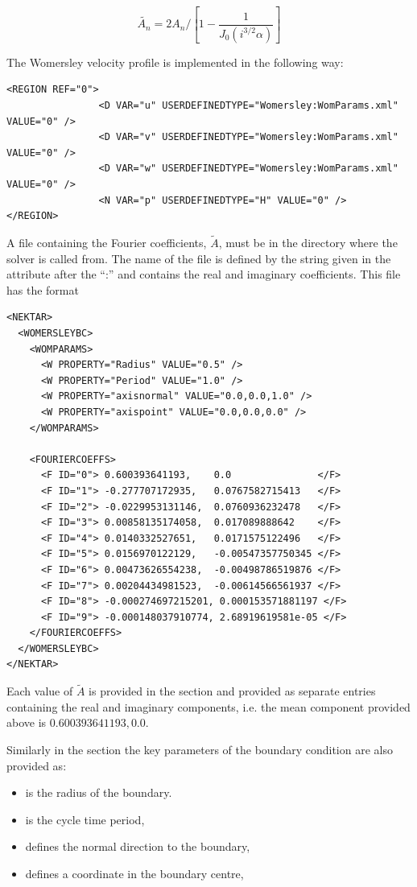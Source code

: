 $$ \tilde{A_n} = 2A_n/[1 - \frac{1}{J_0(i^{3/2}\alpha)}] $$

The Womersley velocity profile is implemented in the following way:

\begin{lstlisting}[style=XMLStyle]
<REGION REF="0">
                <D VAR="u" USERDEFINEDTYPE="Womersley:WomParams.xml" VALUE="0" />
                <D VAR="v" USERDEFINEDTYPE="Womersley:WomParams.xml" VALUE="0" />
                <D VAR="w" USERDEFINEDTYPE="Womersley:WomParams.xml" VALUE="0" />
                <N VAR="p" USERDEFINEDTYPE="H" VALUE="0" />
</REGION>
\end{lstlisting}

A file containing the Fourier coefficients, $\tilde{A}$, must be in
the directory where the solver is called from. The name of the file is
defined by the string given in the attribute 
after the ``:'' and contains the real and imaginary coefficients. This
file has the format
\begin{lstlisting}[style=XMLStyle]
<NEKTAR>
  <WOMERSLEYBC>
    <WOMPARAMS>
      <W PROPERTY="Radius" VALUE="0.5" />
      <W PROPERTY="Period" VALUE="1.0" />
      <W PROPERTY="axisnormal" VALUE="0.0,0.0,1.0" />
      <W PROPERTY="axispoint" VALUE="0.0,0.0,0.0" />
    </WOMPARAMS>

    <FOURIERCOEFFS>
      <F ID="0"> 0.600393641193,    0.0               </F>
      <F ID="1"> -0.277707172935,   0.0767582715413   </F>
      <F ID="2"> -0.0229953131146,  0.0760936232478   </F>
      <F ID="3"> 0.00858135174058,  0.017089888642    </F>
      <F ID="4"> 0.0140332527651,   0.0171575122496   </F>
      <F ID="5"> 0.0156970122129,   -0.00547357750345 </F>
      <F ID="6"> 0.00473626554238,  -0.00498786519876 </F>
      <F ID="7"> 0.00204434981523,  -0.00614566561937 </F>
      <F ID="8"> -0.000274697215201, 0.000153571881197 </F>
      <F ID="9"> -0.000148037910774, 2.68919619581e-05 </F>
    </FOURIERCOEFFS>
  </WOMERSLEYBC>
</NEKTAR>
\end{lstlisting}

Each value of $\tilde{A}$ is provided in the 
section and provided as separate entries containing the real and
imaginary components, i.e. the mean component provided above is
$0.600393641193,0.0$.

Similarly in the  section the key parameters of the boundary condition are also provided as:
\begin{itemize}
\item {} is the radius of the boundary.
\item {} is the cycle time period,
\item {} defines the normal direction to the boundary,
\item {}  defines a coordinate in the boundary centre,
\end{itemize}



